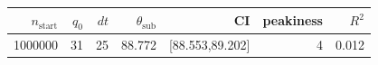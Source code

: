 \begin{tabular}{r r r r r r r}
\hline
$n_{\mathrm{start}}$ & $q_0$ & $dt$ & $\theta_{\mathrm{sub}}$ & CI & peakiness & $R^2$ \\
\hline
1000000 & 31 & 25 & 88.772 & [88.553,89.202] & 4 & 0.012 \\
\hline
\end{tabular}
